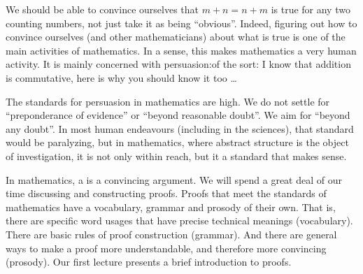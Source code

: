 We should be able to convince ourselves that $m+n = n+m$ is true for any two counting numbers, not just take it as being ``obvious''. 
Indeed, figuring out how to convince ourselves (and other mathematicians) about what is true is one of the main activities of mathematics.
In a sense, this makes mathematics a very human activity.
It is mainly concerned with persuasion:of the sort: I know that addition is commutative, here is why you should know it too \ldots

The standards for persuasion in mathematics are high. We do not settle for ``preponderance of evidence'' or ``beyond reasonable doubt''.
We aim for ``beyond any doubt''. 
In most human endeavours (including in the sciences), that standard would be paralyzing, but in mathematics, where abstract structure is the object of investigation, it is not only within reach, but it a standard that makes sense.

In mathematics, a  is a convincing argument.
We will spend a great deal of our time discussing and constructing proofs.
Proofs that meet the standards of mathematics have a vocabulary, grammar and prosody of their own.
That is, there are specific word usages that have precise technical meanings (vocabulary).
There are basic rules of proof construction (grammar).
And there are general ways to make a proof more understandable, and therefore more convincing (prosody).
Our first lecture presents a brief introduction to proofs.



